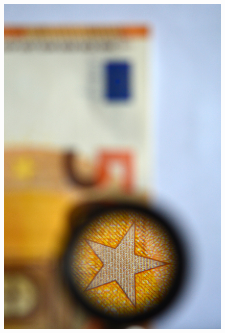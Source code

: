 \begin{figure}[ht]
\centering
\includegraphics[width=7truecm]{slike/02_photos_lupa.jpg}\hfill

\end{figure}
